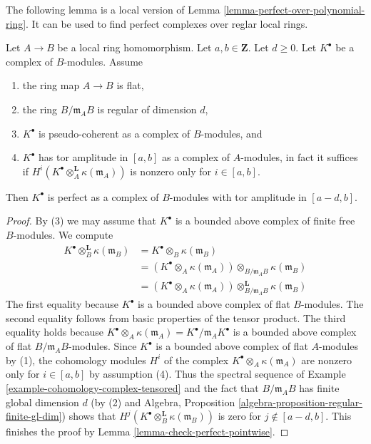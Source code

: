 \noindent
The following lemma is a local version of
Lemma \ref{lemma-perfect-over-polynomial-ring}.
It can be used to find perfect complexes over reglar local rings.

\begin{lemma}
\label{lemma-perfect-over-regular-local-ring}
Let $A \to B$ be a local ring homomorphism.
Let $a, b \in \mathbf{Z}$. Let $d \geq 0$.
Let $K^\bullet$ be a complex of $B$-modules. Assume
\begin{enumerate}
\item the ring map $A \to B$ is flat,
\item the ring $B/\mathfrak m_AB$ is regular of dimension $d$,
\item $K^\bullet$ is pseudo-coherent as a complex of $B$-modules, and
\item $K^\bullet$ has tor amplitude in $[a, b]$ as a complex
of $A$-modules, in fact it suffices if
$H^i(K^\bullet \otimes_A^\mathbf{L} \kappa(\mathfrak m_A))$
is nonzero only for $i \in [a, b]$.
\end{enumerate}
Then $K^\bullet$ is perfect as a complex of $B$-modules
with tor amplitude in $[a - d, b]$.
\end{lemma}

\begin{proof}
By (3) we may assume that $K^\bullet$ is a bounded above complex of finite free
$B$-modules. We compute
\begin{align*}
K^\bullet \otimes_B^{\mathbf{L}} \kappa(\mathfrak m_B)
& = K^\bullet \otimes_B \kappa(\mathfrak m_B) \\
& = (K^\bullet \otimes_A \kappa(\mathfrak m_A))
\otimes_{B/\mathfrak m_A B} \kappa(\mathfrak m_B) \\
& = (K^\bullet \otimes_A \kappa(\mathfrak m_A))
\otimes^{\mathbf{L}}_{B/\mathfrak m_A B} \kappa(\mathfrak m_B)
\end{align*}
The first equality because $K^\bullet$ is a bounded above complex
of flat $B$-modules. The second equality follows from basic 
properties of the tensor product. The third equality holds because
$K^\bullet \otimes_A \kappa(\mathfrak m_A) =
K^\bullet/ \mathfrak m_A K^\bullet$ is a bounded above complex
of flat $B/\mathfrak m_A B$-modules. Since $K^\bullet$ is a bounded
above complex of flat $A$-modules by (1), the cohomology modules $H^i$
of the complex $K^\bullet \otimes_A \kappa(\mathfrak m_A)$ are nonzero only
for $i \in [a, b]$ by assumption (4). Thus the spectral sequence
of Example \ref{example-cohomology-complex-tensored} and the
fact that $B/\mathfrak m_AB$ has finite global dimension $d$
(by (2) and
Algebra, Proposition \ref{algebra-proposition-regular-finite-gl-dim})
shows that $H^j(K^\bullet \otimes_B^{\mathbf{L}} \kappa(\mathfrak m_B))$
is zero for $j \not \in [a - d, b]$.
This finishes the proof by Lemma \ref{lemma-check-perfect-pointwise}.
\end{proof}





